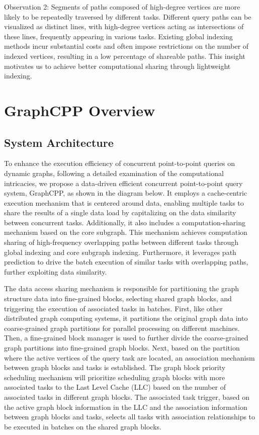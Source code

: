 \documentclass[lettersize,journal]{IEEEtran} %
\begin{document}
Observation 2: Segments of paths composed of high-degree vertices are more likely to be repeatedly traversed by different tasks. Different query paths can be visualized as distinct lines, with high-degree vertices acting as intersections of these lines, frequently appearing in various tasks. Existing global indexing methods incur substantial costs and often impose restrictions on the number of indexed vertices, resulting in a low percentage of shareable paths. This insight motivates us to achieve better computational sharing through lightweight indexing.


\section{GraphCPP Overview}

\subsection{System Architecture}
To enhance the execution efficiency of concurrent point-to-point queries on dynamic graphs, following a detailed examination of the computational intricacies, we propose a data-driven efficient concurrent point-to-point query system, GraphCPP, as shown in the diagram below. It employs a cache-centric execution mechanism that is centered around data, enabling multiple tasks to share the results of a single data load by capitalizing on the data similarity between concurrent tasks. Additionally, it also includes a computation-sharing mechanism based on the core subgraph. This mechanism achieves computation sharing of high-frequency overlapping paths between different tasks through global indexing and core subgraph indexing. Furthermore, it leverages path prediction to drive the batch execution of similar tasks with overlapping paths, further exploiting data similarity.

The data access sharing mechanism is responsible for partitioning the graph structure data into fine-grained blocks, selecting shared graph blocks, and triggering the execution of associated tasks in batches. First, like other distributed graph computing systems, it partitions the original graph data into coarse-grained graph partitions for parallel processing on different machines. Then, a fine-grained block manager is used to further divide the coarse-grained graph partitions into fine-grained graph blocks. Next, based on the partition where the active vertices of the query task are located, an association mechanism between graph blocks and tasks is established. The graph block priority scheduling mechanism will prioritize scheduling graph blocks with more associated tasks to the Last Level Cache (LLC) based on the number of associated tasks in different graph blocks. The associated task trigger, based on the active graph block information in the LLC and the association information between graph blocks and tasks, selects all tasks with association relationships to be executed in batches on the shared graph blocks.
\end{document}
